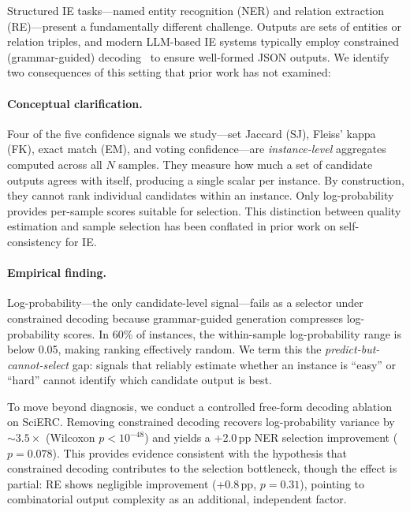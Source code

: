 \documentclass[11pt,a4paper]{article}
\begin{document}
Structured IE tasks---named entity recognition (NER) and relation extraction (RE)---present a fundamentally different challenge. Outputs are sets of entities or relation triples, and modern LLM-based IE systems typically employ constrained (grammar-guided) decoding~\cite{willard2023outlines} to ensure well-formed JSON outputs. We identify two consequences of this setting that prior work has not examined:

\paragraph{Conceptual clarification.} Four of the five confidence signals we study---set Jaccard (SJ), Fleiss' kappa (FK), exact match (EM), and voting confidence---are \emph{instance-level} aggregates computed across all $N$ samples. They measure how much a set of candidate outputs agrees with itself, producing a single scalar per instance. By construction, they cannot rank individual candidates within an instance. Only log-probability provides per-sample scores suitable for selection. This distinction between quality estimation and sample selection has been conflated in prior work on self-consistency for IE.

\paragraph{Empirical finding.} Log-probability---the only candidate-level signal---fails as a selector under constrained decoding because grammar-guided generation compresses log-probability scores. In 60\% of instances, the within-sample log-probability range is below 0.05, making ranking effectively random. We term this the \emph{predict-but-cannot-select} gap: signals that reliably estimate whether an instance is ``easy'' or ``hard'' cannot identify which candidate output is best.

To move beyond diagnosis, we conduct a controlled free-form decoding ablation on SciERC. Removing constrained decoding recovers log-probability variance by ${\sim}3.5{\times}$ (Wilcoxon $p < 10^{-48}$) and yields a +2.0\,pp NER selection improvement ($p{=}0.078$). This provides evidence consistent with the hypothesis that constrained decoding contributes to the selection bottleneck, though the effect is partial: RE shows negligible improvement (+0.8\,pp, $p{=}0.31$), pointing to combinatorial output complexity as an additional, independent factor.
\end{document}
